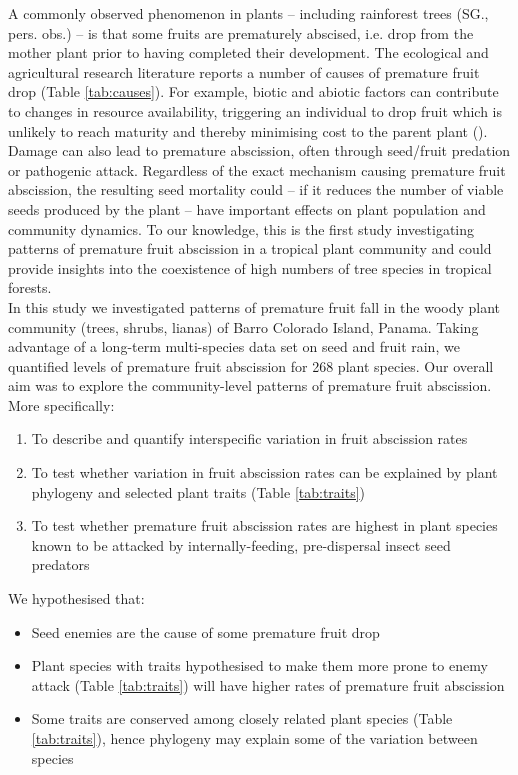 A commonly observed phenomenon in plants – including rainforest trees (SG., pers. obs.) – is that some fruits are prematurely abscised, i.e. drop from the mother plant prior to having completed their development. The ecological and agricultural research literature reports a number of causes of premature fruit drop (Table \ref{tab:causes}). For example, biotic and abiotic factors can contribute to changes in resource availability, triggering an individual to drop fruit which is unlikely to reach maturity and thereby minimising cost to the parent plant (\cite{stephensonFlowerFruitAbortion1981}). Damage can also lead to premature abscission, often through seed/fruit predation or pathogenic attack. Regardless of the exact mechanism causing premature fruit abscission, the resulting seed mortality could – if it reduces the number of viable seeds produced by the plant – have important effects on plant population and community dynamics. To our knowledge, this is the first study investigating patterns of premature fruit abscission in a tropical plant community and could provide insights into the coexistence of high numbers of tree species in tropical forests. \\

In this study we investigated patterns of premature fruit fall in the woody plant community (trees, shrubs, lianas) of Barro Colorado Island, Panama. Taking advantage of a long-term multi-species data set on seed and fruit rain, we quantified levels of premature fruit abscission for 268 plant species. Our overall aim was to explore the community-level patterns of premature fruit abscission. More specifically:

\begin{enumerate}
\item To describe and quantify interspecific variation in fruit abscission rates
\item To test whether variation in fruit abscission rates can be explained by plant phylogeny and selected plant traits (Table \ref{tab:traits})
\item To test whether premature fruit abscission rates are highest in plant species known to be attacked by internally-feeding, pre-dispersal insect seed predators
\end{enumerate} 

We hypothesised that:
\begin{itemize}
\item Seed enemies are the cause of some premature fruit drop
\item Plant species with traits hypothesised to make them more prone to enemy attack (Table \ref{tab:traits}) will have higher rates of premature fruit abscission
\item Some traits are conserved among closely related plant species (Table \ref{tab:traits}), hence phylogeny may explain some of the variation between species 
\end{itemize} \\



